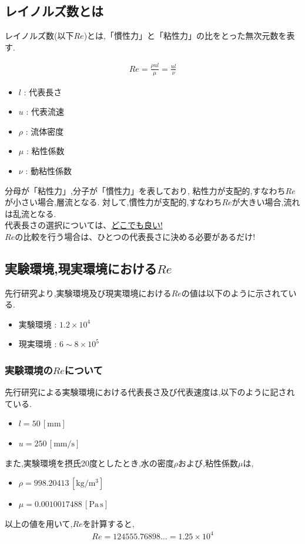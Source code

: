 \documentclass[twocolumn,a4j]{jsarticle}
\begin{document}
\subsection{レイノルズ数とは}
レイノルズ数(以下$Re$)とは,「慣性力」と「粘性力」の比をとった無次元数を表す.
\begin{framed}
    \begin{eqnarray*}
        Re=\frac{\rho u l}{\mu}=\frac{u l}{\nu}
    \end{eqnarray*}
\end{framed}
\begin{itemize}
    \item $l$ : 代表長さ
    \item $u$ : 代表流速
    \item $\rho$ : 流体密度
    \item $\mu$ : 粘性係数
    \item $\nu$ : 動粘性係数
\end{itemize}
\par
分母が「粘性力」,分子が「慣性力」を表しており,
粘性力が支配的,すなわち$Re$が小さい場合,層流となる.
対して,慣性力が支配的,すなわち$Re$が大きい場合,流れは乱流となる.
\\
\textreferencemark 代表長さの選択については、\underline{どこでも良い!}\\
$Re$の比較を行う場合は、ひとつの代表長さに決める必要があるだけ!
\\
\subsection{実験環境,現実環境における$Re$}
先行研究より,実験環境及び現実環境における$Re$の値は以下のように示されている.
\begin{itemize}
    \item 実験環境 : $1.2 × 10^4$
    \item 現実環境 : $6 \sim 8 × 10^5$
\end{itemize}
\subsubsection{実験環境の$Re$について}
先行研究による実験環境における代表長さ及び代表速度は,以下のように記されている.
\begin{itemize}
    \item $l = 50\,[\mathrm{mm}]$
    \item $u = 250\,[\mathrm{mm/s}]$
\end{itemize}
また,実験環境を摂氏20度としたとき,水の密度$\rho$および,粘性係数$\mu$は,
\begin{itemize}
    \item $\rho = 998.20413\,[\mathrm{kg/m^3}]$
    \item $\mu = 0.0010017488\,[\mathrm{Pa\,s}]$
\end{itemize}
以上の値を用いて,$Re$を計算すると,
\begin{eqnarray}
    Re = 124555.76898\dots = 1.25 × 10^4
\end{eqnarray}
\end{document}
